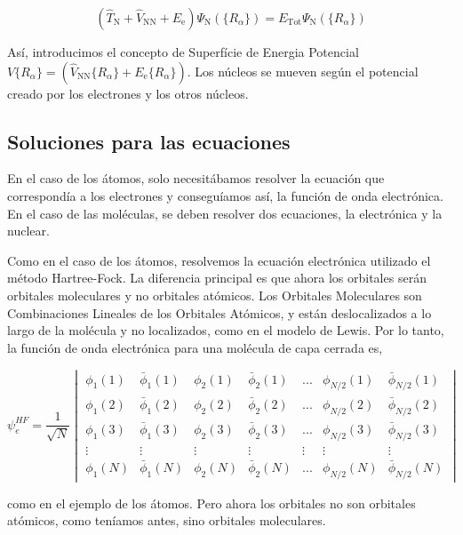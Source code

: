 \documentclass{tufte-book}
\begin{document}
\begin{equation}
    (\hat{T}_\mathrm{N} + \hat{V}_\mathrm{NN} +E_\mathrm{e})\Psi_\mathrm{N}(\{R_\alpha\})
    = E_\mathrm{Tot}\Psi_\mathrm{N}(\{R_\alpha\})
\end{equation}

Así, introducimos el concepto de Superfície de Energia Potencial $V\{R_\alpha\}=(\hat{V}_\mathrm{NN}\{R_\alpha\}+E_\mathrm{e}\{R_\alpha\})$. Los núcleos se mueven según el potencial creado por los electrones y los otros núcleos.

\subsection{Soluciones para las ecuaciones}
En el caso de los átomos, solo necesitábamos  resolver la ecuación que correspondía a los electrones y conseguíamos así, la función de onda electrónica. En el caso de las moléculas, se deben resolver dos ecuaciones, la electrónica y la nuclear.

Como en el caso de los átomos, resolvemos la ecuación electrónica utilizado el método Hartree-Fock. La diferencia principal es que ahora los orbitales serán orbitales moleculares y no orbitales atómicos. Los Orbitales Moleculares son Combinaciones Lineales de los Orbitales Atómicos, y están deslocalizados a lo largo de la molécula y no localizados, como en el modelo de Lewis. Por lo tanto, la función de onda electrónica para una molécula de capa cerrada es,

\begin{equation}
    \psi_e^{HF}=\frac{1}{\sqrt{N}} 
    \begin{vmatrix}
    \phi_1(1) & \bar{\phi}_1(1) & \phi_2(1) & \bar{\phi}_2(1)& ...& \phi_{N/2}(1) & \bar{\phi}_{N/2}(1)\\ 
    \phi_1(2) & \bar{\phi}_1(2) & \phi_2(2) & \bar{\phi}_2(2)& ...& \phi_{N/2}(2) & \bar{\phi}_{N/2}(2) \\
    \phi_1(3) & \bar{\phi}_1(3) & \phi_2(3) & \bar{\phi}_2(3)& ...& \phi_{N/2}(3) & \bar{\phi}_{N/2}(3) \\
    \vdots & \vdots &\vdots &\vdots &\vdots &\vdots &\vdots \\
    \phi_1(N) & \bar{\phi}_1(N) & \phi_2(N) & \bar{\phi}_2(N)& ...& \phi_{N/2}(N) & \bar{\phi}_{N/2}(N)
    \end{vmatrix}
\end{equation}

como en el ejemplo de los átomos. Pero ahora los orbitales no son orbitales atómicos, como teníamos antes, sino orbitales moleculares. 
\end{document}
